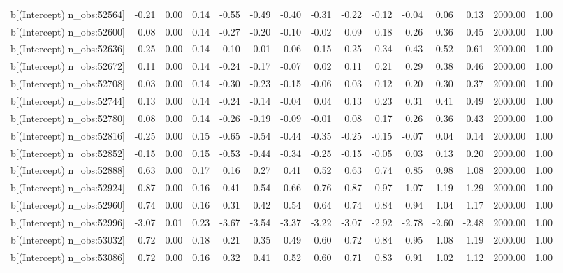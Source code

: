 \begin{table}[ht]
\begin{tabular}{rrrrrrrrrrrrrrr}
  b[(Intercept) n\_obs:52564] & -0.21 & 0.00 & 0.14 & -0.55 & -0.49 & -0.40 & -0.31 & -0.22 & -0.12 & -0.04 & 0.06 & 0.13 & 2000.00 & 1.00 \\ 
  b[(Intercept) n\_obs:52600] & 0.08 & 0.00 & 0.14 & -0.27 & -0.20 & -0.10 & -0.02 & 0.09 & 0.18 & 0.26 & 0.36 & 0.45 & 2000.00 & 1.00 \\ 
  b[(Intercept) n\_obs:52636] & 0.25 & 0.00 & 0.14 & -0.10 & -0.01 & 0.06 & 0.15 & 0.25 & 0.34 & 0.43 & 0.52 & 0.61 & 2000.00 & 1.00 \\ 
  b[(Intercept) n\_obs:52672] & 0.11 & 0.00 & 0.14 & -0.24 & -0.17 & -0.07 & 0.02 & 0.11 & 0.21 & 0.29 & 0.38 & 0.46 & 2000.00 & 1.00 \\ 
  b[(Intercept) n\_obs:52708] & 0.03 & 0.00 & 0.14 & -0.30 & -0.23 & -0.15 & -0.06 & 0.03 & 0.12 & 0.20 & 0.30 & 0.37 & 2000.00 & 1.00 \\ 
  b[(Intercept) n\_obs:52744] & 0.13 & 0.00 & 0.14 & -0.24 & -0.14 & -0.04 & 0.04 & 0.13 & 0.23 & 0.31 & 0.41 & 0.49 & 2000.00 & 1.00 \\ 
  b[(Intercept) n\_obs:52780] & 0.08 & 0.00 & 0.14 & -0.26 & -0.19 & -0.09 & -0.01 & 0.08 & 0.17 & 0.26 & 0.36 & 0.43 & 2000.00 & 1.00 \\ 
  b[(Intercept) n\_obs:52816] & -0.25 & 0.00 & 0.15 & -0.65 & -0.54 & -0.44 & -0.35 & -0.25 & -0.15 & -0.07 & 0.04 & 0.14 & 2000.00 & 1.00 \\ 
  b[(Intercept) n\_obs:52852] & -0.15 & 0.00 & 0.15 & -0.53 & -0.44 & -0.34 & -0.25 & -0.15 & -0.05 & 0.03 & 0.13 & 0.20 & 2000.00 & 1.00 \\ 
  b[(Intercept) n\_obs:52888] & 0.63 & 0.00 & 0.17 & 0.16 & 0.27 & 0.41 & 0.52 & 0.63 & 0.74 & 0.85 & 0.98 & 1.08 & 2000.00 & 1.00 \\ 
  b[(Intercept) n\_obs:52924] & 0.87 & 0.00 & 0.16 & 0.41 & 0.54 & 0.66 & 0.76 & 0.87 & 0.97 & 1.07 & 1.19 & 1.29 & 2000.00 & 1.00 \\ 
  b[(Intercept) n\_obs:52960] & 0.74 & 0.00 & 0.16 & 0.31 & 0.42 & 0.54 & 0.64 & 0.74 & 0.84 & 0.94 & 1.04 & 1.17 & 2000.00 & 1.00 \\ 
  b[(Intercept) n\_obs:52996] & -3.07 & 0.01 & 0.23 & -3.67 & -3.54 & -3.37 & -3.22 & -3.07 & -2.92 & -2.78 & -2.60 & -2.48 & 2000.00 & 1.00 \\ 
  b[(Intercept) n\_obs:53032] & 0.72 & 0.00 & 0.18 & 0.21 & 0.35 & 0.49 & 0.60 & 0.72 & 0.84 & 0.95 & 1.08 & 1.19 & 2000.00 & 1.00 \\ 
  b[(Intercept) n\_obs:53086] & 0.72 & 0.00 & 0.16 & 0.32 & 0.41 & 0.52 & 0.60 & 0.71 & 0.83 & 0.91 & 1.02 & 1.12 & 2000.00 & 1.00 \\ 

\end{tabular}
\end{table}
